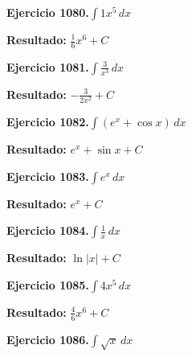 \documentclass[10pt,a4paper]{article}
\begin{document}
\begin{ejbox}
\textbf{Ejercicio 1080.}\quad $\int 1x^{5}\,dx$
\end{ejbox}

\begin{solbox}
\textbf{Resultado:} \(\displaystyle \frac{1}{6}x^{6} + C\)
\end{solbox}

\newpage
\begin{ejbox}
\textbf{Ejercicio 1081.}\quad $\int \frac{3}{x^{3}}\,dx$
\end{ejbox}

\begin{solbox}
\textbf{Resultado:} \(\displaystyle -\frac{3}{2x^{2}} + C\)
\end{solbox}

\begin{ejbox}
\textbf{Ejercicio 1082.}\quad $\int (e^x + \cos x)\,dx$
\end{ejbox}

\begin{solbox}
\textbf{Resultado:} \(\displaystyle e^x + \sin x + C\)
\end{solbox}

\begin{ejbox}
\textbf{Ejercicio 1083.}\quad $\int e^x\,dx$
\end{ejbox}

\begin{solbox}
\textbf{Resultado:} \(\displaystyle e^x + C\)
\end{solbox}

\newpage
\begin{ejbox}
\textbf{Ejercicio 1084.}\quad $\int \frac{1}{x}\,dx$
\end{ejbox}

\begin{solbox}
\textbf{Resultado:} \(\displaystyle \ln|x| + C\)
\end{solbox}

\begin{ejbox}
\textbf{Ejercicio 1085.}\quad $\int 4x^{5}\,dx$
\end{ejbox}

\begin{solbox}
\textbf{Resultado:} \(\displaystyle \frac{4}{6}x^{6} + C\)
\end{solbox}

\begin{ejbox}
\textbf{Ejercicio 1086.}\quad $\int \sqrt{x}\,dx$
\end{ejbox}
\end{document}
